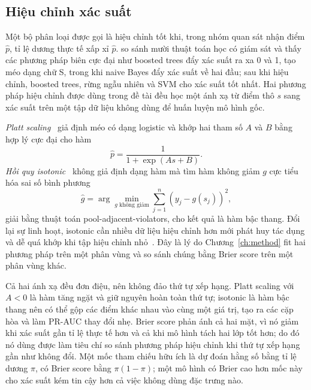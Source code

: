 \subsection{Hiệu chỉnh xác suất}\label{sec:th-calibration}

Một bộ phân loại được gọi là hiệu chỉnh tốt khi, trong nhóm quan sát nhận điểm $\hat p$, tỉ lệ dương thực tế xấp xỉ $\hat p$. \textcite{niculescumizil2005} so sánh mười thuật toán học có giám sát và thấy các phương pháp biên cực đại như boosted trees đẩy xác suất ra xa 0 và 1, tạo méo dạng chữ S, trong khi naive Bayes đẩy xác suất về hai đầu; sau khi hiệu chỉnh, boosted trees, rừng ngẫu nhiên và SVM cho xác suất tốt nhất. Hai phương pháp hiệu chỉnh được dùng trong đề tài đều học một ánh xạ từ điểm thô $s$ sang xác suất trên một tập dữ liệu không dùng để huấn luyện mô hình gốc.

\emph{Platt scaling}~\parencite{platt1999} giả định méo có dạng logistic và khớp hai tham số $A$ và $B$ bằng hợp lý cực đại cho hàm
\begin{equation}\label{eq:th-platt}
  \hat{p} = \frac{1}{1 + \exp(A s + B)} .
\end{equation}
\emph{Hồi quy isotonic}~\parencite{zadrozny2002} không giả định dạng hàm mà tìm hàm không giảm $g$ cực tiểu hóa sai số bình phương
\begin{equation}\label{eq:th-isotonic}
  \hat{g} = \arg\min_{g \text{ không giảm}} \sum_{j=1}^{n} \left( y_j - g(s_j) \right)^2 ,
\end{equation}
giải bằng thuật toán pool-adjacent-violators, cho kết quả là hàm bậc thang. Đổi lại sự linh hoạt, isotonic cần nhiều dữ liệu hiệu chỉnh hơn mới phát huy tác dụng và dễ quá khớp khi tập hiệu chỉnh nhỏ~\parencite{niculescumizil2005}. Đây là lý do Chương~\ref{ch:method} fit hai phương pháp trên một phân vùng và so sánh chúng bằng Brier score trên một phân vùng khác.

Cả hai ánh xạ đều đơn điệu, nên không đảo thứ tự xếp hạng. Platt scaling với $A<0$ là hàm tăng ngặt và giữ nguyên hoàn toàn thứ tự; isotonic là hàm bậc thang nên có thể gộp các điểm khác nhau vào cùng một giá trị, tạo ra các cặp hòa và làm PR-AUC thay đổi nhẹ. Brier score phản ánh cả hai mặt, vì nó giảm khi xác suất gần tỉ lệ thực tế hơn và cả khi mô hình tách hai lớp tốt hơn; do đó nó dùng được làm tiêu chí so sánh phương pháp hiệu chỉnh khi thứ tự xếp hạng gần như không đổi. Một mốc tham chiếu hữu ích là dự đoán hằng số bằng tỉ lệ dương $\pi$, có Brier score bằng $\pi(1-\pi)$; một mô hình có Brier cao hơn mốc này cho xác suất kém tin cậy hơn cả việc không dùng đặc trưng nào.

